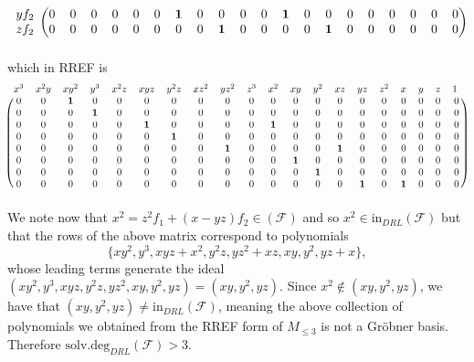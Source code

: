 \documentclass[11pt]{article}
\newcommand{\init}{\text{in}}
\newcommand{\F}{\mathcal{F}}
\newcommand{\sdeg}{\text{solv.deg}}
\begin{document}
\[\begin{blockarray}{ccccccccccccccccccccc}
\begin{block}{c(cccccccccccccccccccc)}
		yf_2 & 0 & 0 & 0 & 0 & 0 & 0 & \mathbf{1} & 0 & 0 & 0 & 0 & \mathbf{1} & 0 & 0 & 0 & 0 & 0 & 0 & 0 & 0 \\
		zf_2 & 0 & 0 & 0 & 0 & 0 & 0 & 0 & 0 & \mathbf{1} & 0 & 0 & 0 & 0 & \mathbf{1} & 0 & 0 & 0 & 0 & 0 & 0 \\
	\end{block}
\end{blockarray} \] which in RREF is \[ \begin{blockarray}{cccccccccccccccccccc}
	x^3 & x^2y & xy^2 & y^3 & x^2z & xyz & y^2z & xz^2 & yz^2 & z^3 & x^2 & xy & y^2 & xz & yz & z^2 & x & y & z & 1\,\, \\
	\begin{block}{(cccccccccccccccccccc)}
		0 & 0 & \mathbf{1} & 0 & 0 & 0 & 0 & 0 & 0 & 0 & 0 & 0 & 0 & 0 & 0 & 0 & 0 & 0 & 0 & 0 \\
		0 & 0 & 0 & \mathbf{1} & 0 & 0 & 0 & 0 & 0 & 0 & 0 & 0 & 0 & 0 & 0 & 0 & 0 & 0 & 0 & 0 \\
		0 & 0 & 0 & 0 & 0 & \mathbf{1} & 0 & 0 & 0 & 0 & \mathbf{1} & 0 & 0 & 0 & 0 & 0 & 0 & 0 & 0 & 0 \\
		0 & 0 & 0 & 0 & 0 & 0 & \mathbf{1} & 0 & 0 & 0 & 0 & 0 & 0 & 0 & 0 & 0 & 0 & 0 & 0 & 0 \\
		0 & 0 & 0 & 0 & 0 & 0 & 0 & 0 & \mathbf{1} & 0 & 0 & 0 & 0 & \mathbf{1} & 0 & 0 & 0 & 0 & 0 & 0 \\
		0 & 0 & 0 & 0 & 0 & 0 & 0 & 0 & 0 & 0 & 0 & \mathbf{1} & 0 & 0 & 0 & 0 & 0 & 0 & 0 & 0 \\
		0 & 0 & 0 & 0 & 0 & 0 & 0 & 0 & 0 & 0 & 0 & 0 & \mathbf{1} & 0 & 0 & 0 & 0 & 0 & 0 & 0 \\
		0 & 0 & 0 & 0 & 0 & 0 & 0 & 0 & 0 & 0 & 0 & 0 & 0 & 0 & \mathbf{1} & 0 & \mathbf{1} & 0 & 0 & 0 \\
	\end{block}
\end{blockarray} \] We note now that $x^2 = z^2f_1 + (x - yz)f_2 \in (\F)$ and so $x^2 \in \init_{DRL}(\F)$ but that the rows of the above matrix correspond to polynomials \[ \{xy^2, y^3, xyz + x^2, y^2z, yz^2 + xz, xy, y^2, yz + x\}, \] whose leading terms generate the ideal $(xy^2, y^3, xyz, y^2z, yz^2, xy, y^2, yz) = (xy, y^2, yz)$. Since $x^2 \notin (xy, y^2, yz)$, we have that $(xy, y^2, yz) \neq \init_{DRL}(\F)$, meaning the above collection of polynomials we obtained from the RREF form of $M_{\leq 3}$ is not a Gröbner basis. Therefore $\sdeg_{DRL}(\F) > 3$. 
\end{document}
